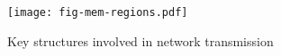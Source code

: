 \begin{figure}[H]
\texttt{[image: fig-mem-regions.pdf]}
\caption{Key structures involved in network transmission}
\label{fig:mem-regions}
\end{figure}
